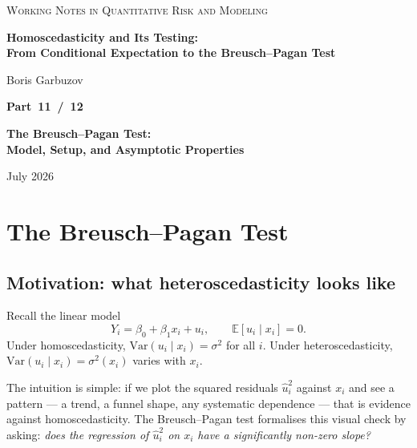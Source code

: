 \documentclass[a4paper,oneside,12pt]{extarticle}
\theoremstyle{plain}
\theoremstyle{definition}
\theoremstyle{remark}
\newcommand*{\E}{\mathbb{E}}
\newcommand*{\Var}{\mathrm{Var}}
\begin{document}
\begin{titlepage}
\begin{center}

{\footnotesize\scshape\color{gray}
Working Notes in Quantitative Risk and Modeling
}

\vfill

{\LARGE\bfseries Homoscedasticity and Its Testing:\\[4pt]
From Conditional Expectation to the Breusch--Pagan Test}

\vspace{36pt}

{\normalsize Boris Garbuzov}

\vfill

{\Large\bfseries Part~11~/~12}

\vspace{6pt}

{\Large\bfseries The Breusch--Pagan Test:\\Model, Setup, and Asymptotic Properties}

\vfill

{\small July 2026}

\end{center}
\end{titlepage}

\setcounter{section}{0}
\setcounter{tocdepth}{2}
\tableofcontents
\newpage

\section{The Breusch--Pagan Test}
\label{sec:bp}

\subsection{Motivation: what heteroscedasticity looks like}

Recall the linear model
\[
  Y_i = \beta_0 + \beta_1 x_i + u_i, \qquad \E[u_i \mid x_i] = 0.
\]
Under homoscedasticity, $\Var(u_i \mid x_i) = \sigma^2$ for all $i$.
Under heteroscedasticity, $\Var(u_i \mid x_i) = \sigma^2(x_i)$ varies
with $x_i$.

The intuition is simple: if we plot the squared residuals $\hat u_i^2$
against $x_i$ and see a pattern --- a trend, a funnel shape, any
systematic dependence --- that is evidence against homoscedasticity.
The Breusch--Pagan test formalises this visual check by asking:
\emph{does the regression of $\hat u_i^2$ on $x_i$ have a
significantly non-zero slope?}
\end{document}
